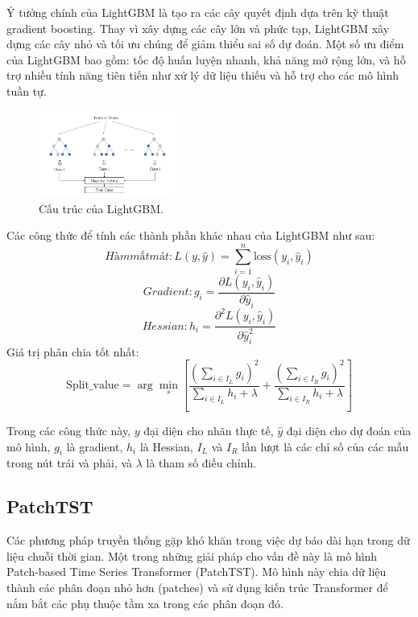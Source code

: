 \documentclass[conference]{IEEEtran}
\begin{document}
Ý tưởng chính của LightGBM là tạo ra các cây quyết định dựa trên kỹ thuật gradient boosting. Thay vì xây dựng các cây lớn và phức tạp, LightGBM xây dựng các cây nhỏ và tối ưu chúng để giảm thiểu sai số dự đoán. Một số ưu điểm của LightGBM bao gồm: tốc độ huấn luyện nhanh, khả năng mở rộng lớn, và hỗ trợ nhiều tính năng tiên tiến như xử lý dữ liệu thiếu và hỗ trợ cho các mô hình tuần tự.

\begin{figure}[H]
    \centering
    \includegraphics[width=0.4\textwidth]{bibliography/pictures/lightgbm.png}
    \caption{Cấu trúc của LightGBM.}
\end{figure}

Các công thức để tính các thành phần khác nhau của LightGBM như sau: 
\[
Hàm mất mát: L(y, \hat{y}) = \sum_{i=1}^{n} \text{loss}(y_i, \hat{y}_i)
\]
\[
Gradient: g_i = \frac{\partial L(y_i, \hat{y}_i)}{\partial \hat{y}_i}
\]
\[
Hessian: h_i = \frac{\partial^2 L(y_i, \hat{y}_i)}{\partial \hat{y}_i^2}
\]
Giá trị phân chia tốt nhất:
\[
\text{Split\_value} = \arg\min_{s} \left[ \frac{(\sum_{i \in I_L} g_i)^2}{\sum_{i \in I_L} h_i + \lambda} + \frac{(\sum_{i \in I_R} g_i)^2}{\sum_{i \in I_R} h_i + \lambda} \right]
\]

Trong các công thức này, $y$ đại diện cho nhãn thực tế, $\hat{y}$ đại diện cho dự đoán của mô hình, $g_i$ là gradient, $h_i$ là Hessian, $I_L$ và $I_R$ lần lượt là các chỉ số của các mẫu trong nút trái và phải, và $\lambda$ là tham số điều chỉnh.
\subsection{PatchTST}
Các phương pháp truyền thống gặp khó khăn trong việc dự báo dài hạn trong dữ liệu chuỗi thời gian. Một trong những giải pháp cho vấn đề này là mô hình Patch-based Time Series Transformer (PatchTST). Mô hình này chia dữ liệu thành các phân đoạn nhỏ hơn (patches) và sử dụng kiến trúc Transformer để nắm bắt các phụ thuộc tầm xa trong các phân đoạn đó.
\end{document}
